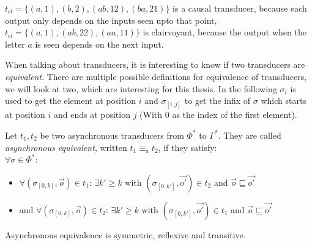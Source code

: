 \begin{exmp}[name = Causal and Clairvoyant Transducers]
  \(t_{cl} = \{(a,1),(b,2),(ab,12),(ba,21)\}\) is a causal transducer, because each output only depends on the inputs seen upto that point, \(t_{cl} = \{(a,1),(ab,22),(aa,11)\}\) is clairvoyant, because the output when the letter \(a\) is seen depends on the next input.
\end{exmp}

When talking about transducers, it is interesting to know if two transducers are \emph{equivalent}.
There are multiple possible definitions for equivalence of transducers, we will look at two, which are interesting for this thesis.
In the following \(\sigma_i\) is used to get the element at position \(i\) and \(\sigma_{[i,j]}\) to get the infix of \(\sigma\) which starts at position \(i\) and ends at position \(j\) (With \(0\) as the index of the first element).

\begin{definition}[name = Asynchronous equivalence of Transducers]\label{def:async_equivalence_transducer}
  Let \(t_1, t_2\) be two asynchronous transducers from \(\Phi^*\) to \(\Gamma^*\).
  They are called \emph{asynchronous equivalent}, written \(t_1 \equiv_a t_2\), if they satisfy: \\
  \(\forall \sigma \in \Phi^*\):
  \begin{itemize}
    \item \(\forall (\sigma_{[0,k]}, \vec{o}) \in t_1\): \(\exists k' \geq k \text{ with } (\sigma_{[0,k']}, \vec{o'}) \in t_2\) and \(\vec{o} \sqsubseteq \vec{o'}\)
    \item and \(\forall (\sigma_{[0,k]}, \vec{o}) \in t_2\): \(\exists k' \geq k \text{ with } (\sigma_{[0,k']}, \vec{o'}) \in t_1\) and \(\vec{o} \sqsubseteq \vec{o'}\)
  \end{itemize}
\end{definition}

\begin{lemma}[name=Asynchronous equivalence is an equivalence Relation]\label{lemma:async_equivalence_is_equivalence_relationship}
  Asynchronous equivalence is symmetric, reflexive and transitive.
\end{lemma}

